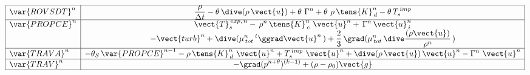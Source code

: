 \begin{equation}\label{Base_Predvv_tab_ext1}
\begin{array}{|l|c|}
\hline
\var{ROVSDT}^{n}
& \displaystyle
\frac{\rho}{\Delta t} -\theta \,\dive (\rho\,\vect {u}) +\theta \,\, \Gamma^n + \theta \,\, \rho\,\tens{K}_{\,d}^n-\theta \,T_s^{\,imp} \\
\hline
\var{PROPCE}^{n}
& \displaystyle
\vect{T}_{s}^{\,exp,\,n}-\,\rho^{n}\,\tens{K}_{\,e}^{n}\ \vect{u}^{n} + \,\Gamma^{n}\,\vect{u}_{\,i}^{n}\\
& \displaystyle
-\vect{turb}^{n}+ \dive (\mu_{\,tot}^{n}\,^t\ggrad \vect {u}^{n}\,)+ \frac {2} {3}\,\grad (\mu_{\,tot}^{n}\,\dive \frac{(\rho \vect {u})}{\rho^{n}}\,)\\
\hline
\var{TRAVA}^{n} &
\displaystyle
-\theta_S\,\var{PROPCE}^{n-1} -\rho\,\tens{K}_{\,d}^n\ \vect{u}^{n} + T_s^{\,imp}\,\,\vect {u}^{n} + \dive (\rho\,\vect {u})\,\vect{u}^{n} - \Gamma^n\,\,\vect{u}^{n}\\
\hline
\var{TRAV}^{n}
& \displaystyle
- \grad (p^{n+\theta})^{(k-1)} + (\rho -\rho_0) \vect {g} \\
\hline
\end{array}
\end{equation}


